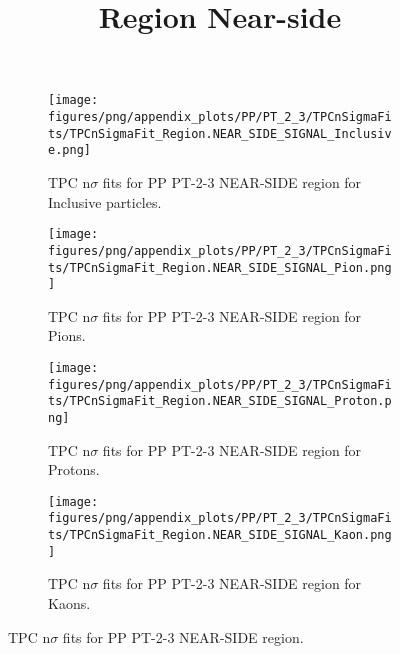             \begin{figure}[H]
                \title{Region Near-side}
                \begin{subfigure}[b]{0.5\textwidth}
                    \centering
                    \texttt{[image: figures/png/appendix\_plots/PP/PT\_2\_3/TPCnSigmaFits/TPCnSigmaFit\_Region.NEAR\_SIDE\_SIGNAL\_Inclusive.png]}
                    \caption{TPC n$\sigma$ fits for PP PT-2-3 NEAR-SIDE region for Inclusive particles.}
                    \label{fig:appendix_PP_PT-2-3_NEAR_SIDE_SIGNAL_Inclusive}
                \end{subfigure}
                \begin{subfigure}[b]{0.5\textwidth}
                    \centering
                    \texttt{[image: figures/png/appendix\_plots/PP/PT\_2\_3/TPCnSigmaFits/TPCnSigmaFit\_Region.NEAR\_SIDE\_SIGNAL\_Pion.png]}
                    \caption{TPC n$\sigma$ fits for PP PT-2-3 NEAR-SIDE region for Pions.}
                    \label{fig:appendix_PP_PT-2-3_NEAR_SIDE_SIGNAL_Pion}
                \end{subfigure}
                \begin{subfigure}[b]{0.5\textwidth}
                    \centering
                    \texttt{[image: figures/png/appendix\_plots/PP/PT\_2\_3/TPCnSigmaFits/TPCnSigmaFit\_Region.NEAR\_SIDE\_SIGNAL\_Proton.png]}
                    \caption{TPC n$\sigma$ fits for PP PT-2-3 NEAR-SIDE region for Protons.}
                    \label{fig:appendix_PP_PT-2-3_NEAR_SIDE_SIGNAL_Proton}
                \end{subfigure}
                \begin{subfigure}[b]{0.5\textwidth}
                    \centering
                    \texttt{[image: figures/png/appendix\_plots/PP/PT\_2\_3/TPCnSigmaFits/TPCnSigmaFit\_Region.NEAR\_SIDE\_SIGNAL\_Kaon.png]}
                    \caption{TPC n$\sigma$ fits for PP PT-2-3 NEAR-SIDE region for Kaons.}
                    \label{fig:appendix_PP_PT-2-3_NEAR_SIDE_SIGNAL_Kaon}
                \end{subfigure}
                \caption{TPC n$\sigma$ fits for PP PT-2-3 NEAR-SIDE region.}
                \label{fig:appendix_PP_PT-2-3_NEAR_SIDE_SIGNAL}
            \end{figure}
